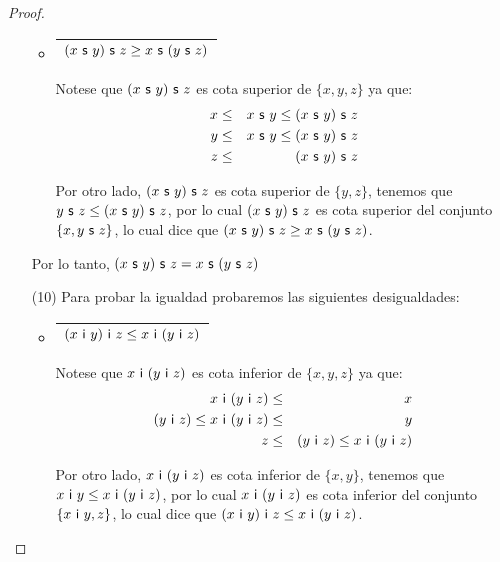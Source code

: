 \begin{proof}
\begin{enumerate}
\begin{itemize}
          \item \begin{tabular}{|c|} \hline $(x \ \SU \ y) \ \SU \ z \geq x \ \SU \ (y \ \SU \ z)$\\\hline \end{tabular}
            \PN Notese que $(x \ \SU \ y) \ \SU \ z$ es cota superior de $\{x, y, z\}$ ya que:
            \begin{eqnarray*}
              x &\leq& x \ \mathsf{s} \ y \leq (x \ \mathsf{s} \ y) \ \mathsf{s} \ z \\
              y &\leq& x \ \mathsf{s} \ y \leq (x \ \mathsf{s} \ y) \ \mathsf{s} \ z \\
              z &\leq& (x \ \mathsf{s} \ y) \ \mathsf{s} \ z
            \end{eqnarray*}

            \PN Por otro lado, $(x \ \SU \ y) \ \SU \ z$ es cota superior de $\{y, z\}$, tenemos que $y \ \mathsf{s} \ z \leq
            (x \ \mathsf{s} \ y) \ \mathsf{s} \ z$, por lo cual $(x \ \SU \ y) \ \SU \ z$ es cota superior del conjunto $\{x, y \ \mathsf{s}
            \ z\}$, lo cual dice que $(x \ \SU \ y) \ \SU \ z \geq x \ \SU \ (y \ \SU \ z)$.
        \end{itemize}

        \PN Por lo tanto, $(x \ \mathsf{s} \ y) \ \mathsf{s} \ z = x \ \mathsf{s} \ (y \ \mathsf{s} \ z)$

      \item[(10)] Para probar la igualdad probaremos las siguientes desigualdades:
        \begin{itemize}
          \item \begin{tabular}{|c|} \hline $(x \ \mathsf{i} \ y) \ \mathsf{i} \ z \leq x \ \mathsf{i} \ (y \ \mathsf{i} \ z)$\\\hline \end{tabular}
            \PN Notese que $x \ \IN \ (y \ \IN \ z)$ es cota inferior de $\{x, y, z\}$ ya que:
            \begin{eqnarray*}
              x \ \IN \ (y \ \IN \ z) &\leq& x \\
              (y \ \IN \ z) \leq x \ \IN \ (y \ \IN \ z) &\leq& y \\
              z &\leq& (y \ \IN \ z) \leq x \ \IN \ (y \ \IN \ z)
            \end{eqnarray*}

            \PN Por otro lado, $x \ \IN \ (y \ \IN \ z)$ es cota inferior de $\{x, y\}$, tenemos que $x \ \mathsf{i} \ y \leq x
            \ \mathsf{i} \ (y \ \mathsf{i} \ z)$, por lo cual $x \ \IN \ (y \ \IN \ z)$ es cota inferior del conjunto $\{x \ \mathsf{i} \ y,
            z\}$, lo cual dice que $(x \ \mathsf{i} \ y) \ \mathsf{i} \ z \leq x \ \mathsf{i} \ (y \ \mathsf{i} \ z)$.


\end{itemize}
\end{enumerate}
\end{proof}
